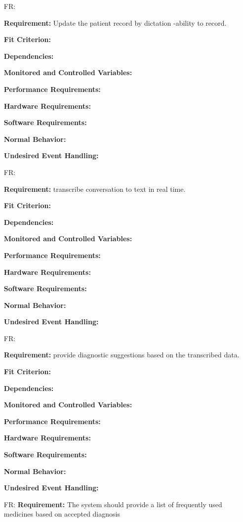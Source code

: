 \documentclass[12pt]{article}
\newcounter{reqnum} %
\begin{document}
\begin{itemize}
\item[FR\refstepcounter{reqnum}\thereqnum \label{FR_meaningfulLabel}:] 

\textbf{Requirement:} Update the patient record by dictation -ability to record. 

\textbf{Fit Criterion:}  

\textbf{Dependencies:}  

\textbf{Monitored and Controlled Variables:} 

\textbf{Performance Requirements:} 

\textbf{Hardware Requirements:} 

\textbf{Software Requirements:} 

\textbf{Normal Behavior:} 

\textbf{Undesired Event Handling:} 

\item[FR\refstepcounter{reqnum}\thereqnum \label{FR_meaningfulLabel}:] 

\textbf{Requirement:} transcribe conversation to text in real time. 

\textbf{Fit Criterion:}  

\textbf{Dependencies:}  

\textbf{Monitored and Controlled Variables:} 

\textbf{Performance Requirements:} 

\textbf{Hardware Requirements:} 

\textbf{Software Requirements:} 

\textbf{Normal Behavior:} 

\textbf{Undesired Event Handling:} 

\item[FR\refstepcounter{reqnum}\thereqnum \label{FR_meaningfulLabel}:] 

\textbf{Requirement:} provide diagnostic suggestions based on the transcribed data.

\textbf{Fit Criterion:}  

\textbf{Dependencies:}  

\textbf{Monitored and Controlled Variables:} 

\textbf{Performance Requirements:} 

\textbf{Hardware Requirements:} 

\textbf{Software Requirements:} 

\textbf{Normal Behavior:} 

\textbf{Undesired Event Handling:} 

\item[FR\refstepcounter{reqnum}\thereqnum \label{FR_meaningfulLabel}:] 
\textbf{Requirement:} The system should provide a list of frequently used medicines based on accepted diagnosis


\end{itemize}
\end{document}
